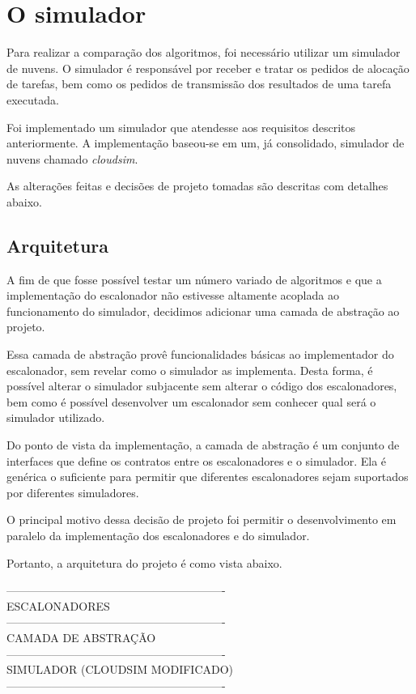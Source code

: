 \documentclass[a4paper,10pt]{article}
\begin{document}
\section{O simulador}

Para realizar a comparação dos algoritmos, foi necessário utilizar um simulador de nuvens. O simulador é
responsável por receber e tratar os pedidos de alocação de tarefas, bem como os pedidos de transmissão dos
resultados de uma tarefa executada.

Foi implementado um simulador que atendesse aos requisitos descritos anteriormente. A implementação baseou-se
em um, já consolidado, simulador de nuvens chamado \emph{cloudsim}\cite{cloudsim}.

As alterações feitas e decisões de projeto tomadas são descritas com detalhes abaixo.

\subsection{Arquitetura}

A fim de que fosse possível testar um número variado de algoritmos e que a implementação do escalonador
não estivesse altamente acoplada ao funcionamento do simulador, decidimos adicionar uma camada de abstração
ao projeto.

Essa camada de abstração provê funcionalidades básicas ao implementador do escalonador, sem revelar como o
simulador as implementa. Desta forma, é possível alterar o simulador subjacente sem alterar o código dos escalonadores,
bem como é possível desenvolver um escalonador sem conhecer qual será o simulador utilizado.

Do ponto de vista da implementação, a camada de abstração é um conjunto de interfaces que define os contratos
entre os escalonadores e o simulador.
Ela é genérica o suficiente para permitir que diferentes escalonadores sejam suportados por diferentes simuladores.

O principal motivo dessa decisão de projeto foi permitir o desenvolvimento em paralelo da implementação dos escalonadores
e do simulador.

Portanto, a arquitetura do projeto é como vista abaixo.

\begin{center}
----------------------------------------------------------\\
                ESCALONADORES                 \\
----------------------------------------------------------\\
             CAMADA DE ABSTRAÇÃO              \\
----------------------------------------------------------\\
        SIMULADOR (CLOUDSIM MODIFICADO)        \\
----------------------------------------------------------\\
\end{center}
\end{document}
